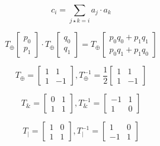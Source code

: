 $$\displaystyle c_i = \sum_{j \star k = i} {a_j \cdot a_k}$$

$$T_{\oplus} \begin{bmatrix} p_0 \\ p_1 \end{bmatrix} \cdot T_{\oplus} \begin{bmatrix} q_0 \\ q_1 \end{bmatrix} = T_{\oplus} \begin{bmatrix} p_0q_0+p_1q_1 \\ p_0q_1+p_1q_0 \end{bmatrix}$$

$$T_{\oplus}= \begin{bmatrix} 1 & 1 \\ 1 & -1 \end{bmatrix}, T_{\oplus}^{-1}= \frac{1}{2} \begin{bmatrix} 1 & 1 \\ 1 & -1 \end{bmatrix}$$

$$T_{\&}=\begin{bmatrix} 0 & 1 \\ 1 & 1 \end{bmatrix}, T_{\&}^{-1}= \begin{bmatrix} -1 & 1 \\ 1 & 0 \end{bmatrix}$$

$$T_{|}=\begin{bmatrix} 1 & 0 \\ 1 & 1 \end{bmatrix}, T_{|}^{-1}= \begin{bmatrix} 1 & 0 \\ -1 & 1 \end{bmatrix}$$
